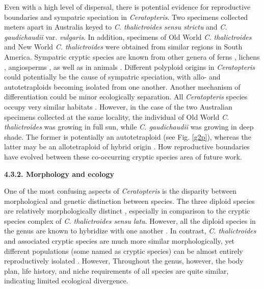 \documentclass[12pt]{article}
\begin{document}
\begin{flushleft}
Even with a high level of dispersal, there is potential evidence for reproductive boundaries and sympatric speciation in \textit{Ceratopteris}. Two specimens collected meters apart in Australia keyed to \textit{C. thalictroides sensu strictu} and \textit{C. gaudichaudii} var. \textit{vulgaris}. In addition, specimens of Old World \textit{C. thalictroides} and New World \textit{C. thalictroides} were obtained from similar regions in South America. Sympatric cryptic species are known from other genera of ferns \autocite{Patel2019, Yatabe2009}, lichens \autocite{Del_Carmen_Molina2011}, angiosperms \autocite{Les2015, Soltis2007}, as well as in animals \autocite{Amor2014, Hebert2004, Nygren2014}. Different polyploid origins in \textit{Ceratopteris} could potentially be the cause of sympatric speciation, with allo- and autotetraploids becoming isolated from one another. Another mechanism of differentiation could be minor ecologically separation. All \textit{Ceratopteris} species occupy very similar habitats \autocite{LloydTax1974, Masuyama2010}. However, in the case of the two Australian specimens collected at the same locality, the individual of Old World \textit{C. thalictroides} was growing in full sun, while \textit{C. gaudichaudii} was growing in deep shade. The former is potentially an autotetraploid (see Fig. \ref{g2p}), whereas the latter may be an allotetraploid of hybrid origin \autocite{Adjie2007}. How reproductive boundaries have evolved between these co-occurring cryptic species area of future work.

\textbf{4.3.2. Morphology and ecology}

One of the most confusing aspects of \textit{Ceratopteris} is the disparity between morphological and genetic distinction between species. The three diploid species are relatively morphologically distinct \autocite{LloydTax1974}, especially in comparison to the cryptic species complex of \textit{C. thalictroides sensu latu}. However, all the diploid species in the genus are known to hybridize with one another \autocite{hickok1974, Hickok1977, LloydTax1974}. In contrast, \textit{C. thalictroides} and associated cryptic species are much more similar morphologically, yet different populations (some named as cryptic species) can be almost entirely reproductively isolated \autocite{Hickok1979, Masuyama2002, Masuyama2010}. However, Throughout the genus, however, the body plan, life history, and niche requirements of all species are quite similar, indicating limited ecological divergence.


\end{flushleft}
\end{document}
